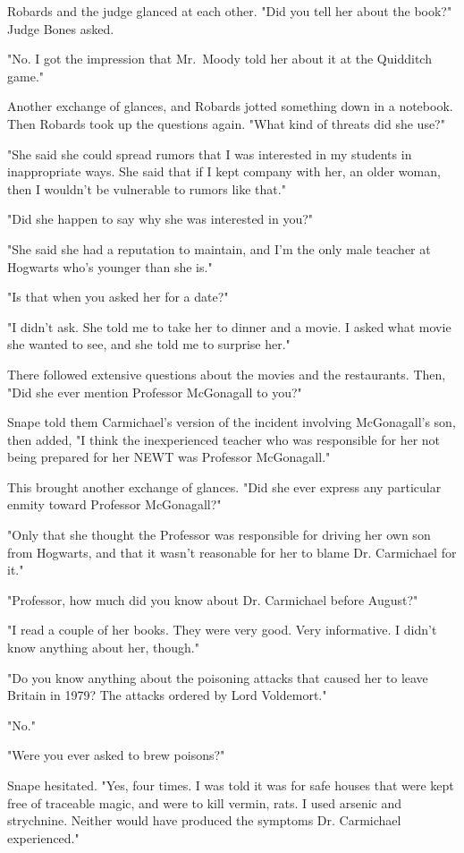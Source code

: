 Robards and the judge glanced at each other. "Did you tell her about the book?" Judge Bones asked.

"No. I got the impression that Mr.~Moody told her about it at the Quidditch game."

Another exchange of glances, and Robards jotted something down in a notebook. Then Robards took up the questions again. "What kind of threats did she use?"

"She said she could spread rumors that I was interested in my students in inappropriate ways. She said that if I kept company with her, an older woman, then I wouldn't be vulnerable to rumors like that."

"Did she happen to say why she was interested in you?"

"She said she had a reputation to maintain, and I'm the only male teacher at Hogwarts who's younger than she is."

"Is that when you asked her for a date?"

"I didn't ask. She told me to take her to dinner and a movie. I asked what movie she wanted to see, and she told me to surprise her."

There followed extensive questions about the movies and the restaurants. Then, "Did she ever mention Professor McGonagall to you?"

Snape told them Carmichael's version of the incident involving McGonagall's son, then added, "I think the inexperienced teacher who was responsible for her not being prepared for her NEWT was Professor McGonagall."

This brought another exchange of glances. "Did she ever express any particular enmity toward Professor McGonagall?"

"Only that she thought the Professor was responsible for driving her own son from Hogwarts, and that it wasn't reasonable for her to blame Dr. Carmichael for it."

"Professor, how much did you know about Dr. Carmichael before August?"

"I read a couple of her books. They were very good. Very informative. I didn't know anything about her, though."

"Do you know anything about the poisoning attacks that caused her to leave Britain in 1979? The attacks ordered by Lord Voldemort."

"No."

"Were you ever asked to brew poisons?"

Snape hesitated. "Yes, four times. I was told it was for safe houses that were kept free of traceable magic, and were to kill vermin, rats. I used arsenic and strychnine. Neither would have produced the symptoms Dr. Carmichael experienced."

